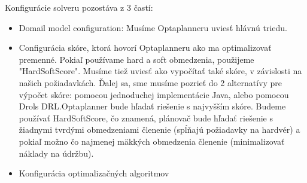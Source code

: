 \newpage
Konfigurácie solveru pozostáva z 3 častí: 
\begin{itemize}
\item Domail model configuration: Musíme Optaplanneru uviesť hlávnú triedu.
\item Configurácia skóre, ktorá hovorí Optaplanneru ako ma optimalizovať premenné. Pokiaľ používame hard a soft obmedzenia, použijeme "HardSoftScore". Musíme tiež uviesť ako vypočítať také skóre, v závislosti na našich požiadavkách. Ďalej sa, sme musíme  pozrieť do 2 alternatívy pre výpočet skóre: pomocou jednoduchej implementácie Java, alebo pomocou Drols DRL.Optaplanner bude hľadať riešenie s najvyšším skóre. Budeme používať HardSoftScore, čo znamená, plánovač bude hľadať riešenie s žiadnymi tvrdými obmedzeniami členenie (spĺňajú požiadavky na hardvér) a pokiaľ možno čo najmenej mäkkých obmedzenia členenie (minimalizovať náklady na údržbu).
\item Konfigurácia optimalizačných algoritmov

\end{itemize}





